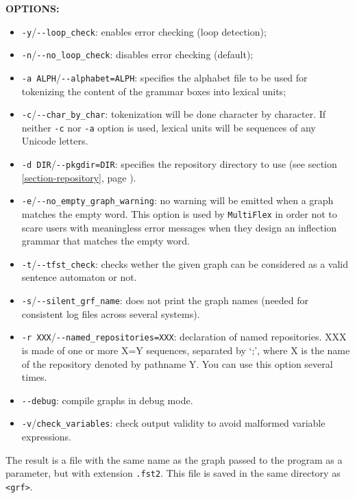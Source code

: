 \bigskip
\noindent \textbf{OPTIONS:}
\begin{itemize}
  \item \verb+-y+/\verb+--loop_check+: enables error checking (loop
  detection);
  \item \verb+-n+/\verb+--no_loop_check+: disables error checking (default);
  \item \verb+-a ALPH+/\verb+--alphabet=ALPH+: specifies the alphabet file to be
  used for tokenizing the content of the grammar boxes into lexical units;
  \item \verb+-c+/\verb+--char_by_char+: tokenization will be done character by
  character. If neither \verb+-c+ nor \verb+-a+ option is used, lexical units 
  will be sequences of any Unicode letters.
  \item \verb+-d DIR+/\verb+--pkgdir=DIR+: specifies the repository directory to
  use (see section \ref{section-repository}, page
  \pageref{section-repository}).
  \item \verb+-e+/\verb+--no_empty_graph_warning+: no warning will be emitted
  when a graph matches the empty word. This option is used by \verb+MultiFlex+
  in order not to scare users with meaningless error messages when they design
  an inflection grammar that matches the empty word. 
  \item \verb+-t+/\verb+--tfst_check+: checks wether the given graph can be
  considered as a valid sentence automaton or not.
  \item \verb+-s+/\verb+--silent_grf_name+: does not print the graph names
  (needed for consistent log files across several systems).
  \item \verb+-r XXX+/\verb+--named_repositories=XXX+: declaration of named
  repositories. XXX is made of one or more X=Y sequences, separated by `;', where
  X is the name of the repository denoted by pathname Y. You can use this 
  option several times.
  \item \verb+--debug+: compile graphs in debug mode.
  \item \verb+-v+/\verb+check_variables+: check output validity to avoid malformed variable expressions.
\end{itemize}

\bigskip
\noindent The result is a file with the same name as the graph passed to the
program as a parameter, but with extension \verb+.fst2+. This file is saved in
the same directory as \verb+<grf>+.


